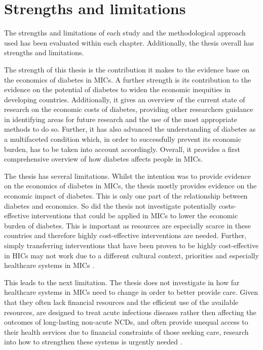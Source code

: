\section{Strengths and limitations}

The strengths and limitations of each study and the methodological approach used has been evaluated within each chapter. Additionally, the thesis overall has strengths and limitations.

The strength of this thesis is the contribution it makes to the evidence base on the economics of diabetes in \acp{MIC}. A further strength is its contribution to the evidence on the potential of diabetes to widen the economic inequities in developing countries. Additionally, it gives an overview of the current state of research on the economic costs of diabetes, providing other researchers guidance in identifying areas for future research and the use of the most appropriate methods to do so. Further, it has also advanced the understanding of diabetes as a multifaceted condition which, in order to successfully prevent its economic burden, has to be taken into account accordingly. Overall, it provides a first comprehensive overview of how diabetes affects people in \acp{MIC}.

The thesis has several limitations. Whilst the intention was to provide evidence on the economics of diabetes in \acp{MIC}, the thesis mostly provides evidence on the economic impact of diabetes. This is only one part of the relationship between diabetes and economics. So did the thesis not investigate potentially costs-effective interventions that could be applied in \acp{MIC} to lower the economic burden of diabetes. This is important as resources are especially scarce in these countries and therefore highly cost-effective interventions are needed. Further, simply transferring interventions that have been proven to be highly cost-effective in \acp{HIC} may not work due to a different cultural context, priorities and especially healthcare systems in \acp{MIC} \parencite{Mills2014}.

This leads to the next limitation. The thesis does not investigate in how far healthcare systems in \acp{MIC} need to change in order to better provide care. Given that they often lack financial resources and the efficient use of the available resources, are designed to treat acute infectious diseases rather then affecting the outcomes of long-lasting non-acute \acp{NCD}, and often provide unequal access to their health services due to financial constraints of those seeking care, research into how to strengthen these systems is urgently needed \parencite{Mills2014,Guzman2010}.

